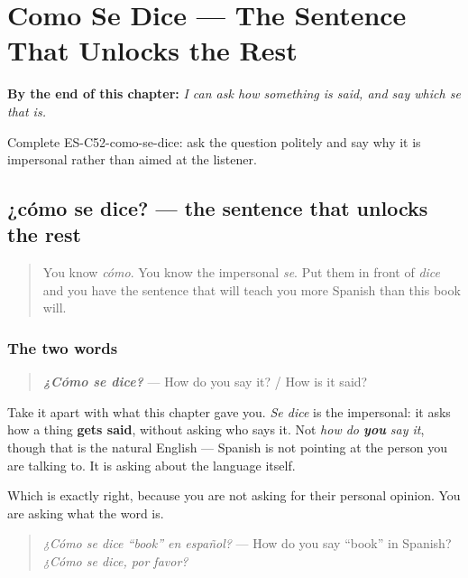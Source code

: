 
\chapter{Como Se Dice --- The Sentence That Unlocks the Rest}
\label{ch:como-se-dice}

\begin{chapteropening}
\textbf{By the end of this chapter:} \emph{I can ask how something is said, and say which se that is.}

Complete ES-C52-como-se-dice: ask the question politely and say why it is impersonal rather than aimed at the listener.
\end{chapteropening}

\section[¿cómo se dice?]{¿cómo se dice? — the sentence that unlocks the rest}

\label{lesson:ES-C52-como-se-dice}



\begin{quote}
You know \emph{cómo}. You know the impersonal \emph{se}. Put them in front of \emph{dice} and you have the sentence that will teach you more Spanish than this book will.
\end{quote}

\subsection*{The two words}
\begin{quote}
\emph{\textbf{¿Cómo se dice?}} — How do you say it? / How is it said?
\end{quote}

Take it apart with what this chapter gave you. \emph{Se dice} is the impersonal: it asks how a thing \textbf{gets said}, without asking who says it. Not \emph{how do \textbf{you} say it}, though that is the natural English — Spanish is not pointing at the person you are talking to. It is asking about the language itself.

Which is exactly right, because you are not asking for their personal opinion. You are asking what the word is.

\begin{quote}
\emph{¿Cómo se dice \textquotedblleft{}book\textquotedblright{} en español?} — How do you say \textquotedblleft{}book\textquotedblright{} in Spanish? \emph{¿Cómo se dice, por favor?}
\end{quote}

